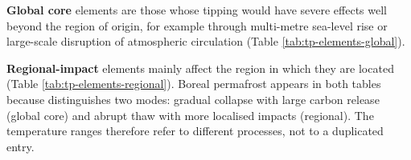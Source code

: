 \documentclass[
]{krantz}
\begin{document}
\textbf{Global core} elements are those whose tipping would have severe effects
well beyond the region of origin, for example through multi-metre sea-level
rise or large-scale disruption of atmospheric circulation (Table
\ref{tab:tp-elements-global}).

\begin{table}[!h]
\centering
\caption{\label{tab:tp-elements-global}Global core tipping elements and their estimated temperature thresholds above pre-industrial levels. Source: Armstrong McKay et al. (2022), Table 1.}
\centering
{}
\end{table}

\textbf{Regional-impact} elements mainly affect the region in which they are
located (Table \ref{tab:tp-elements-regional}). Boreal permafrost
appears in both tables because \citet{armstrongmckay2022} distinguishes two modes:
gradual collapse with large carbon release (global core) and abrupt thaw
with more localised impacts (regional). The temperature ranges therefore
refer to different processes, not to a duplicated entry.
\end{document}
